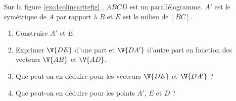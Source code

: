 \begin{exo}\label{exo1colinearite}
 Sur la figure \ref{exo1colinearitefig} , $ABCD$ est un parall\'elogramme. $A'$ est le sym\'etrique de $A$ par rapport \`a $B$ et $E$ est le milieu de $[BC]$.


 \begin{enumerate}
  \item Construire $A'$ et $E$.
  \item Exprimer $\V{DE}$ d'une part et $\V{DA'}$ d'autre part en fonction des vecteurs $\V{AB}$ et $\V{AD}$.
  \item Que peut-on en d\'eduire pour les vecteurs $\V{DE}$ et $\V{DA'}$ ?
  \item Que peut-on en d\'eduire pour les points $A'$, $E$ et $D$ ?
 \end{enumerate}
\end{exo}

